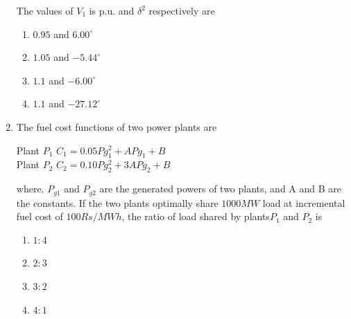 \documentclass[journal]{IEEEtran}
\begin{document}
\begin{enumerate}
 The values of $V_1$ is p.u. and $\delta ^2$ respectively are
		\begin{enumerate}
			\item $0.95$ and $6.00^{\circ}$
			\item $1.05$ and $-5.44^{\circ}$
			\item $1.1$ and $-6.00^{\circ}$
			\item $1.1$ and $-27.12^{\circ}$
        	\end{enumerate}	
    \item The fuel cost functions of two power plants are 
    \begin{center}
          Plant $P_1$    $C_1=0.05Pg_1^2+APg_1+B$\\
         Plant $P_2$    $C_2=0.10Pg_2^2+3APg_2+B$\\
    \end{center}
    where. $P_{g1}$ and $P_{g2}$ are the generated powers of two plants, and A and B are the constants. If the two plants optimally share $1000 MW$ load at incremental fuel cost of $100Rs/MWh$, the ratio of load shared by plants$P_1$ and $P_2$ is
    
		\begin{enumerate}
			\item $1:4$
			\item $2:3$
			\item $3:2$
			\item $4:1$
        	\end{enumerate}	
\end{enumerate}	
\end{document}
